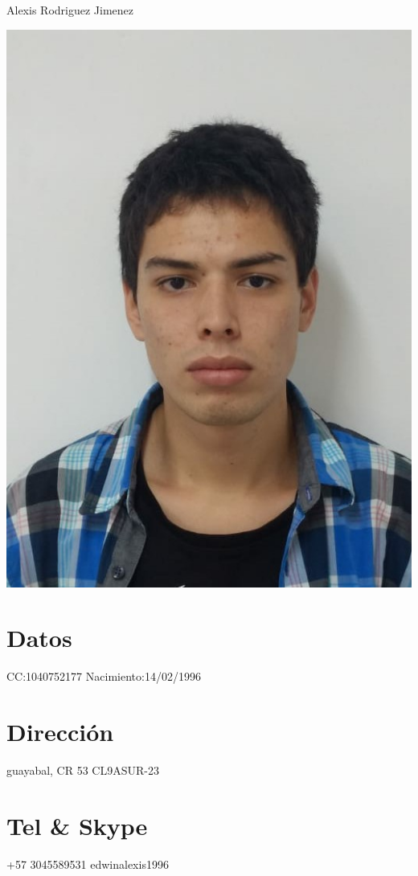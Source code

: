 \documentclass[]{friggeri-cv}
\begin{document}
\header 
{\hspace{2\baselineskip} Alexis} { Rodriguez Jimenez}
  

\begin{aside}
\includegraphics[scale=0.2]{img/Photo.png}
  \section{Datos}
    CC:1040752177
    Nacimiento:14/02/1996
    ~
  \section{Dirección}
    guayabal,
    CR 53 CL9ASUR-23
    ~
  \section{Tel \& Skype}
    +57 3045589531  
    edwinalexis1996
    ~

\end{aside}
\end{document}

